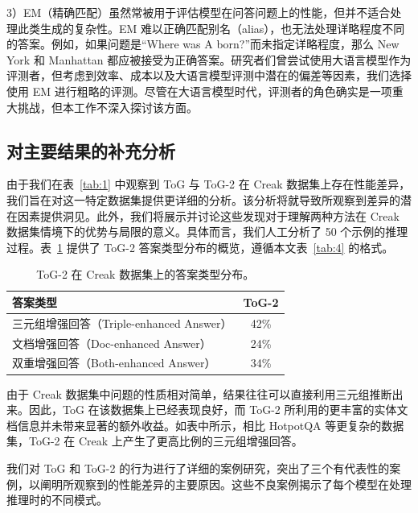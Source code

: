 \documentclass[11pt,UTF8,fontset=fandol]{ctexart}
\newcommand{\toctwo}{ToG-2}
\begin{document}
3）EM（精确匹配）虽然常被用于评估模型在问答问题上的性能，但并不适合处理此类生成的复杂性。EM 难以正确匹配别名（alias），也无法处理详略程度不同的答案。例如，如果问题是“Where was A born?”而未指定详略程度，那么 New York 和 Manhattan 都应被接受为正确答案。研究者们曾尝试使用大语言模型作为评测者，但考虑到效率、成本以及大语言模型评测中潜在的偏差等因素，我们选择使用 EM 进行粗略的评测。尽管在大语言模型时代，评测者的角色确实是一项重大挑战，但本工作不深入探讨该方面。

\subsection{对主要结果的补充分析}

由于我们在表~\ref{tab:1} 中观察到 ToG 与 \toctwo{} 在 Creak 数据集上存在性能差异，我们旨在对这一特定数据集提供更详细的分析。该分析将就导致所观察到差异的潜在因素提供洞见。此外，我们将展示并讨论这些发现对于理解两种方法在 Creak 数据集情境下的优势与局限的意义。具体而言，我们人工分析了 50 个示例的推理过程。表~\ref{tab:6} 提供了 \toctwo{} 答案类型分布的概览，遵循本文表~\ref{tab:4} 的格式。

\begin{table}[H]\centering
\caption{\toctwo{} 在 Creak 数据集上的答案类型分布。}
\begin{tabular}{lc}
\toprule
答案类型 & \toctwo{}\\
\midrule
三元组增强回答（Triple-enhanced Answer） & 42\%\\
文档增强回答（Doc-enhanced Answer） & 24\%\\
双重增强回答（Both-enhanced Answer） & 34\%\\
\bottomrule
\end{tabular}
\label{tab:6}
\end{table}

由于 Creak 数据集中问题的性质相对简单，结果往往可以直接利用三元组推断出来。因此，ToG 在该数据集上已经表现良好，而 \toctwo{} 所利用的更丰富的实体文档信息并未带来显著的额外收益。如表中所示，相比 HotpotQA 等更复杂的数据集，\toctwo{} 在 Creak 上产生了更高比例的三元组增强回答。

我们对 ToG 和 \toctwo{} 的行为进行了详细的案例研究，突出了三个有代表性的案例，以阐明所观察到的性能差异的主要原因。这些不良案例揭示了每个模型在处理推理时的不同模式。
\end{document}
